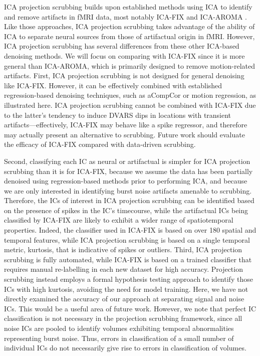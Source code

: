 \documentclass{article}
\begin{document}
ICA projection scrubbing builds upon established methods using ICA to identify and remove artifacts in fMRI data, most notably ICA-FIX \citep{salimi-khorshidiAutomaticDenoisingFunctional2014} and ICA-AROMA \citep{pruimICAAROMARobustICAbased2015}.  Like those approaches, ICA projection scrubbing takes advantage of the ability of ICA to separate neural sources from those of artifactual origin in fMRI.  However, ICA projection scrubbing has several differences from these other ICA-based denoising methods.  We will focus on comparing with ICA-FIX since it is more general than ICA-AROMA, which is primarily designed to remove motion-related artifacts. First, ICA projection scrubbing is not designed for general denoising like ICA-FIX. However, it can be effectively combined with established regression-based denoising techniques, such as aCompCor or motion regression, as illustrated here. ICA projection scrubbing cannot be combined with ICA-FIX due to the latter's tendency to induce DVARS dips \citep{glasser2018using} in locations with transient artifacts---effectively, ICA-FIX may behave like a spike regressor, and therefore may actually present an alternative to scrubbing. Future work should evaluate the efficacy of ICA-FIX compared with data-driven scrubbing.


Second, classifying each IC as neural or artifactual is simpler for ICA projection scrubbing than it is for ICA-FIX, because we assume the data has been partially denoised using regression-based methods prior to performing ICA, and because we are only interested in identifying burst noise artifacts amenable to scrubbing.  Therefore, the ICs of interest in ICA projection scrubbing can be identified based on the presence of spikes in the IC's timecourse, while the artifactual ICs being classified by ICA-FIX are likely to exhibit a wider range of spatiotemporal properties. Indeed, the classifier used in ICA-FIX is based on over 180 spatial and temporal features, while ICA projection scrubbing is based on a single temporal metric, kurtosis, that is indicative of spikes or outliers. Third, ICA projection scrubbing is fully automated, while ICA-FIX is based on a trained classifier that requires manual re-labelling in each new dataset for high accuracy. Projection scrubbing instead employs a formal hypothesis testing approach to identify those ICs with high kurtosis, avoiding the need for model training. 
Here, we have not directly examined the accuracy of our approach at separating signal and noise ICs. This would be a useful area of future work.  However, we note that perfect IC classification is not necessary in the projection scrubbing framework, since all noise ICs are pooled to identify volumes exhibiting temporal abnormalities representing burst noise. Thus, errors in classification of a small number of individual ICs do not necessarily give rise to errors in classification of volumes.
\end{document}

